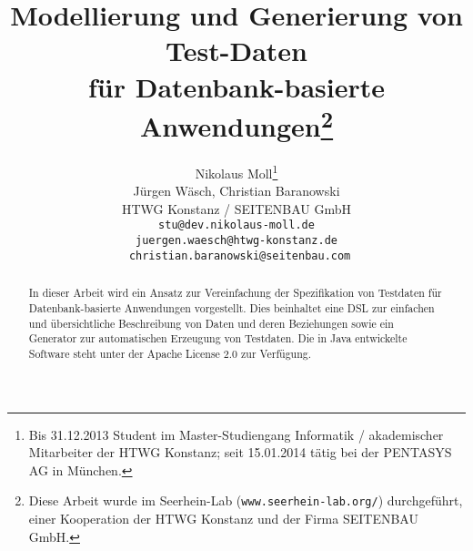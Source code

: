 \documentclass{lni}
\author{
	Nikolaus Moll\footnote{Bis 31.12.2013 Student im Master-Studiengang Informatik / akademischer Mitarbeiter der HTWG Konstanz; seit 15.01.2014 tätig bei der PENTASYS AG in München.}
\\ Jürgen Wäsch, Christian Baranowski \\ 
	HTWG Konstanz / SEITENBAU GmbH\\ 
           \texttt{stu@dev.nikolaus-moll.de}\\ \texttt{juergen.waesch@htwg-konstanz.de}\\ \texttt{ christian.baranowski@seitenbau.com} 
}
\title{Modellierung und Generierung von Test-Daten\\ für Datenbank-basierte Anwendungen\footnote{Diese Arbeit wurde im Seerhein-Lab (\texttt{www.seerhein-lab.org/}) durchgeführt, einer Kooperation der HTWG Konstanz und der Firma SEITENBAU GmbH.}}
\begin{document}
\maketitle




\begin{abstract}
%
In dieser Arbeit wird ein Ansatz zur Vereinfachung der Spezifikation von Testdaten für Datenbank-basierte Anwendungen vorgestellt. 
%
Dies beinhaltet eine DSL zur einfachen und übersichtliche Beschreibung von Daten und deren Beziehungen sowie ein Generator zur automatischen Erzeugung von Testdaten. 
%
%
Die in Java entwickelte Software steht unter der Apache License 2.0 zur Verfügung.

%

\end{abstract}







\clearpage



\clearpage






\end{document}
